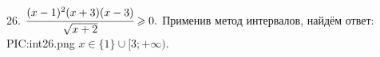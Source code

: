 26. $\cfrac{(x-1)^2(x+3)(x-3)}{\sqrt{x+2}}\geqslant0.$ Применив метод интервалов, найдём ответ:
{{PIC:int26.png}}
$x\in\{1\}\cup[3;+\infty).$\newpage\noindent
